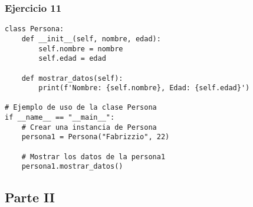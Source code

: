 \documentclass[10pt,a4paper]{article}
\begin{document}
\subsubsection{Ejercicio 11}
\begin{lstlisting}
class Persona:
    def __init__(self, nombre, edad):
        self.nombre = nombre
        self.edad = edad
        
    def mostrar_datos(self):
        print(f'Nombre: {self.nombre}, Edad: {self.edad}')

# Ejemplo de uso de la clase Persona
if __name__ == "__main__":
    # Crear una instancia de Persona
    persona1 = Persona("Fabrizzio", 22)
    
    # Mostrar los datos de la persona1
    persona1.mostrar_datos()

\end{lstlisting}
\newpage
\subsection{Parte II}
\end{document}
